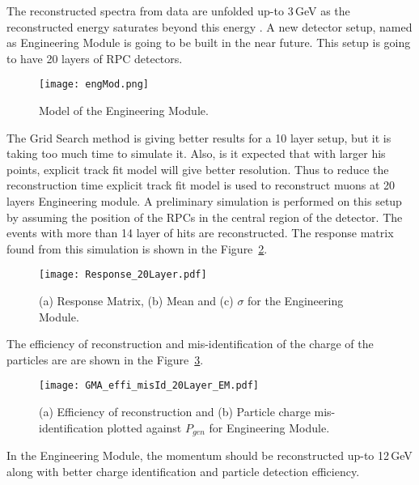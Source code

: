 The reconstructed spectra from data are unfolded up-to 3\,GeV as the
reconstructed energy saturates beyond this energy \cite{daeratio,ratio1}. %
A new detector setup, named as Engineering Module is going to be
built in the near future. This setup is going to have 20 layers of RPC
detectors.
\begin{figure}[h]
  \centering
  \texttt{[image: engMod.png]}
  \caption{Model of the Engineering Module.}
  \label{fig:eng_mod}
\end{figure}
The Grid Search method is giving better results for a 10 layer setup, but it is taking too
much time to simulate it. Also, is it expected that with larger his points, explicit
track fit model will give better resolution. Thus to reduce the reconstruction time
explicit track fit model is used to reconstruct muons at 20 layers Engineering module.
A preliminary simulation is performed on this setup by assuming the
position of the RPCs in the central region of the detector. The events
with more than 14 layer of hits are reconstructed.
The response matrix found from this simulation is shown in the
Figure~\ref{fig:eng_mod}.
\begin{figure}[h]
  \centering
  \texttt{[image: Response\_20Layer.pdf]}
  \caption{(a) Response Matrix, (b) Mean and (c) $\sigma$ for
    the Engineering Module.}
  \label{fig:eng_mod}
\end{figure}
The efficiency of reconstruction and mis-identification of the charge
of the particles are are shown in the Figure~\ref{fig:eng_mod_effi}.
\begin{figure}[h]
  \centering
  \texttt{[image: GMA\_effi\_misId\_20Layer\_EM.pdf]}
  \caption{(a) Efficiency of reconstruction and (b) Particle charge
    mis-identification plotted against $P_{gen}$ for Engineering Module.}
  \label{fig:eng_mod_effi}
\end{figure}
In the Engineering Module, the momentum should be reconstructed
up-to 12\,GeV along with better charge identification and particle
detection efficiency.

